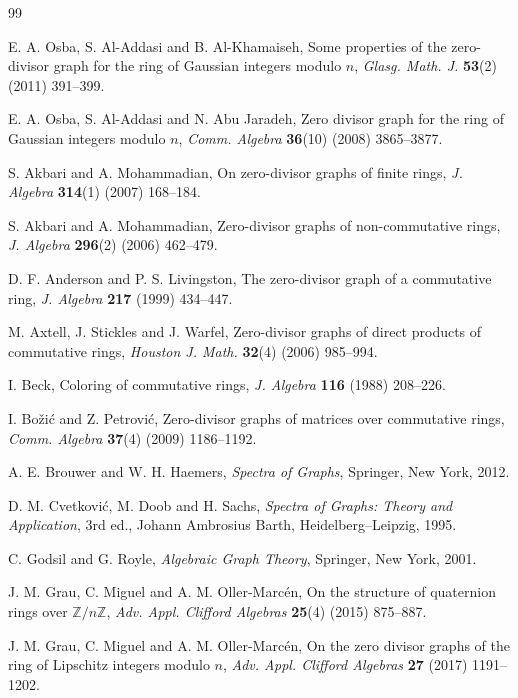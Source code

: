 \documentclass[12pt]{article}
\theoremstyle{definition}
\newcommand{\Z}{\mathbb{Z}}
\begin{document}
	\begin{thebibliography}{99}
		
		E. A. Osba, S. Al-Addasi and B. Al-Khamaiseh,
		Some properties of the zero-divisor graph for the ring of Gaussian integers modulo $n$,
		\emph{Glasg. Math. J.} \textbf{53}(2) (2011) 391--399.
		
		E. A. Osba, S. Al-Addasi and N. Abu Jaradeh,
		Zero divisor graph for the ring of Gaussian integers modulo $n$,
		\emph{Comm. Algebra} \textbf{36}(10) (2008) 3865--3877.
		
		S. Akbari and A. Mohammadian,
		On zero-divisor graphs of finite rings,
		\emph{J. Algebra} \textbf{314}(1) (2007) 168--184.
		
		S. Akbari and A. Mohammadian,
		Zero-divisor graphs of non-commutative rings,
		\emph{J. Algebra} \textbf{296}(2) (2006) 462--479.
		
		D. F. Anderson and P. S. Livingston,
		The zero-divisor graph of a commutative ring,
		\emph{J. Algebra} \textbf{217} (1999) 434--447.
		
		M. Axtell, J. Stickles and J. Warfel,
		Zero-divisor graphs of direct products of commutative rings,
		\emph{Houston J. Math.} \textbf{32}(4) (2006) 985--994.
		
		I. Beck,
		Coloring of commutative rings,
		\emph{J. Algebra} \textbf{116} (1988) 208--226.
		
		I. Bo\v{z}i\'c and Z. Petrovi\'c,
		Zero-divisor graphs of matrices over commutative rings,
		\emph{Comm. Algebra} \textbf{37}(4) (2009) 1186--1192.
		
		A. E. Brouwer and W. H. Haemers,
		\emph{Spectra of Graphs},
		Springer, New York, 2012.
		
		
		D. M. Cvetkovi\'c, M. Doob and H. Sachs,
		\emph{Spectra of Graphs: Theory and Application},
		3rd ed., Johann Ambrosius Barth, Heidelberg--Leipzig, 1995.
		
		
		C. Godsil and G. Royle,
		\emph{Algebraic Graph Theory},
		Springer, New York, 2001.
		
		J. M. Grau, C. Miguel and A. M. Oller-Marc\'en,
		On the structure of quaternion rings over $\Z/n\Z$,
		\emph{Adv. Appl. Clifford Algebras} \textbf{25}(4) (2015) 875--887.
		
		J. M. Grau, C. Miguel and A. M. Oller-Marc\'en,
		On the zero divisor graphs of the ring of Lipschitz integers modulo $n$,
		\emph{Adv. Appl. Clifford Algebras} \textbf{27} (2017) 1191--1202.
		

\end{thebibliography}
\end{document}
